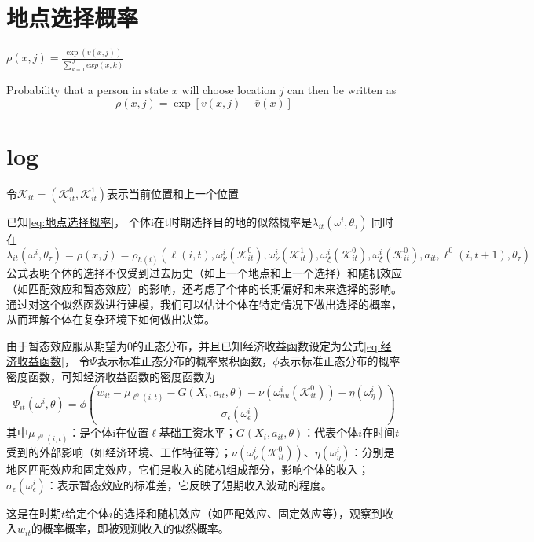 \documentclass[a4paper,12pt,oneside]{book} %
\begin{document}
\chapter{地点选择概率}
$\rho(x,j)=\frac{\exp(v(x,j))}{\sum\limits_{k=1}^{J} exp(x,k)}$

Probability that a person in state $x$ will choose location $j$ can then be written as
$$\rho(x,j)=\exp[v(x,j)-\bar v(x)]$$

\chapter{log} %

令$\mathcal{K}_{it}=(\mathcal{K}_{it}^{0},\mathcal{K}_{it}^{1})$表示当前位置和上一个位置

已知\ref{eq:地点选择概率}，
个体i在t时期选择目的地的似然概率是$\lambda_{it}(\omega^{i},\theta_{\tau})$
同时在
\begin{equation}
  \lambda_{it}(\omega^{i},\theta_{\tau})=\rho(x,j)=\rho_{h(i)}(\ell(i,t),\omega_{\nu}^{i}(\mathcal{K}_{it}^{0}),\omega_{\nu}^{i}(\mathcal{K}_{it}^{1}),\omega_{\xi}^{i}(\mathcal{K}_{it}^{0}),\omega_{\xi}^{i}(\mathcal{K}_{it}^{0}),a_{it},\ell^{0}(i,t+1),\theta_{\tau})
\end{equation}
公式表明个体的选择不仅受到过去历史（如上一个地点和上一个选择）和随机效应（如匹配效应和暂态效应）的影响，还考虑了个体的长期偏好和未来选择的影响。
通过对这个似然函数进行建模，我们可以估计个体在特定情况下做出选择的概率，从而理解个体在复杂环境下如何做出决策。


由于暂态效应服从期望为$0$的正态分布，并且已知经济收益函数设定为公式\ref{eq:经济收益函数}，
令$\Psi$表示标准正态分布的概率累积函数，$\phi$表示标准正态分布的概率密度函数，可知经济收益函数的密度函数为
\begin{equation}
  \Psi_{it}(\omega^{i},\theta)=\phi(\frac{w_{it} - \mu_{\ell^{0}(i,t)}-G(X_{i},a_{it},\theta)-\nu(\omega_{nu}^{i}(\mathcal{K}_{it}^{0}))-\eta(\omega_{\eta}^{i})  }{\sigma_{\epsilon}(\omega_{\epsilon}^{i})})
\end{equation}
其中$\mu_{\ell^{0}(i,t)}$：是个体i在位置$\ell$基础工资水平；$G(X_i, a_{it}, \theta)$：代表个体$i$在时间$t$受到的外部影响（如经济环境、工作特征等）；$\nu(\omega_{\nu}^i(\mathcal{K}_{it}^0))$、$\eta(\omega_{\eta}^i)$：分别是地区匹配效应和固定效应，它们是收入的随机组成部分，影响个体的收入；$\sigma_{\epsilon}(\omega_{\epsilon}^i)$：表示暂态效应的标准差，它反映了短期收入波动的程度。

这是在时期$t$给定个体$i$的选择和随机效应（如匹配效应、固定效应等），观察到收入$w_{it}$的概率概率，即被观测收入的似然概率。

\newpage


\end{document}
